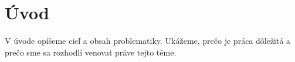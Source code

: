 \chapter*{Úvod} %

V úvode opíšeme cieľ a obsah problematiky. Ukážeme,
prečo je práca dôležitá a prečo sme sa rozhodli venovať práve tejto téme.